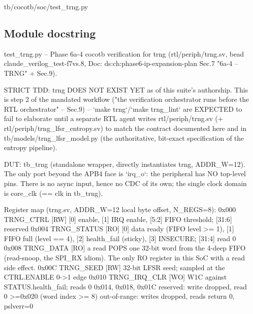 \begin{relocated}{tb/cocotb/soc/test_trng.py}

\subsection*{Module docstring}

\begin{textblock}
test_trng.py -- Phase 6a-4 cocotb verification for trng (rtl/periph/trng.sv, bead
claude_verilog_test-f7vs.8, Doc: ds:ch:phase6-ip-expansion-plan Sec.7 "6a-4 -- TRNG" + Sec.9).

STRICT TDD: trng DOES NOT EXIST YET as of this suite's authorship. This is step 2 of the mandated
workflow ("the verification orchestrator runs before the RTL orchestrator" -- Sec.9) --
`make trng`/`make trng_lint` are EXPECTED to fail to elaborate until a separate RTL agent writes
rtl/periph/trng.sv (+ rtl/periph/trng_lfsr_entropy.sv) to match the contract documented here and in
tb/models/trng_lfsr_model.py (the authoritative, bit-exact specification of the entropy pipeline).

DUT: tb_trng (standalone wrapper, directly instantiates trng, ADDR_W=12). The only port beyond the
APB4 face is `irq_o`: the peripheral has NO top-level pins. There is no async input, hence no CDC of
its own; the single clock domain is core_clk (== clk in tb_trng).

Register map (trng.sv, ADDR_W=12 local byte offset, N_REGS=8):
0x000  TRNG_CTRL     [RW]   [0] enable, [1] IRQ enable, [5:2] FIFO threshold; [31:6] reserved
0x004  TRNG_STATUS   [RO]   [0] data ready (FIFO level >= 1), [1] FIFO full (level == 4),
[2] health_fail (sticky), [3] INSECURE; [31:4] read 0
0x008  TRNG_DATA     [RO]   a read POPS one 32-bit word from the 4-deep FIFO (read-snoop, the
SPI_RX idiom). The only RO register in this SoC with a read side effect.
0x00C  TRNG_SEED     [RW]   32-bit LFSR seed; sampled at the CTRL.ENABLE 0->1 edge
0x010  TRNG_IRQ_CLR  [WO]   W1C against STATUS.health_fail; reads 0
0x014, 0x018, 0x01C  reserved: write dropped, read 0
>=0x020 (word index >= 8)   out-of-range: writes dropped, reads return 0, pslverr=0


\end{textblock}
\end{relocated}
